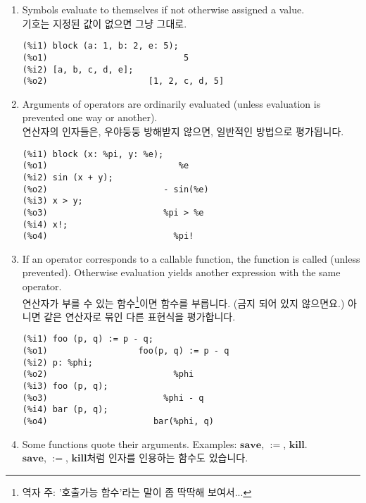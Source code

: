 \documentclass[12pt]{article}
\begin{document}
\begin{enumerate}

\item Symbols evaluate to themselves if not otherwise assigned a value. \\
기호는 지정된 값이 없으면 그냥 그대로.

\begin{verbatim}
(%i1) block (a: 1, b: 2, e: 5);
(%o1)                           5
(%i2) [a, b, c, d, e];
(%o2)                    [1, 2, c, d, 5]
\end{verbatim}

\item Arguments of operators are ordinarily evaluated (unless evaluation is prevented one way or another). \\
연산자의 인자들은, 우야둥둥 방해받지 않으면, 일반적인 방법으로 평가됩니다.

\begin{verbatim}
(%i1) block (x: %pi, y: %e);
(%o1)                          %e
(%i2) sin (x + y);
(%o2)                       - sin(%e)
(%i3) x > y; 
(%o3)                       %pi > %e
(%i4) x!;
(%o4)                         %pi!
\end{verbatim}

\item If an operator corresponds to a callable function,
the function is called (unless prevented).
Otherwise evaluation yields another expression with the same operator. \\
연산자가 부를 수 있는 함수\footnote{역자 주: '호출가능 함수'라는 말이 좀 딱딱해 보여서...}이면 함수를 부릅니다. 
(금지 되어 있지 않으면요.) 아니면 같은 연산자로 묶인 다른 표현식을 평가합니다.

\begin{verbatim}
(%i1) foo (p, q) := p - q;
(%o1)                  foo(p, q) := p - q
(%i2) p: %phi;
(%o2)                         %phi
(%i3) foo (p, q);
(%o3)                       %phi - q
(%i4) bar (p, q);
(%o4)                     bar(%phi, q)
\end{verbatim}

\item Some functions quote their arguments.
Examples: $\mathbf{save}$, $\mathbf{:=}$, $\mathbf{kill}$. \\
$\mathbf{save}$, $\mathbf{:=}$, $\mathbf{kill}$처럼 인자를 인용하는 함수도 있습니다.


\end{enumerate}
\end{document}
